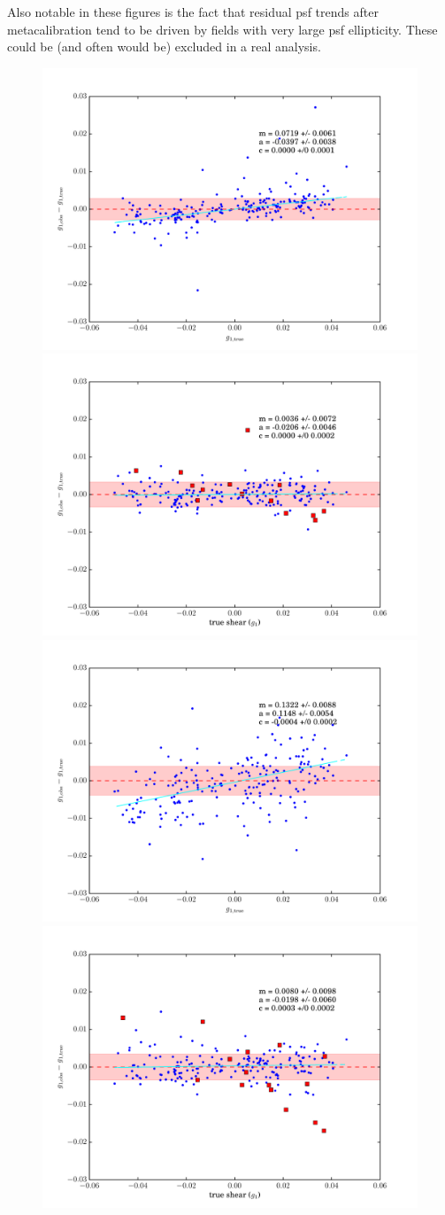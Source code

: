 \documentclass[iop]{emulateapj}
\begin{document}
Also notable in these figures is the fact that residual psf trends
after metacalibration tend to be driven by fields with very large psf
ellipticity. These could be (and often would be) excluded in a real
analysis. 
\begin{figure}[t]
\begin{center}
\includegraphics[width=0.49\linewidth]{./Plots/m1-no_corrections-regauss.pdf}
\includegraphics[width=0.49\linewidth]{./Plots/m1-regauss-opt-shear_plots.pdf}
\includegraphics[width=0.49\linewidth]{./Plots/m1-no_corrections-ksb.pdf}
\includegraphics[width=0.49\linewidth]{./Plots/m1-ksb-opt-shear_plots.pdf}

\end{center}
\end{figure}
\end{document}
